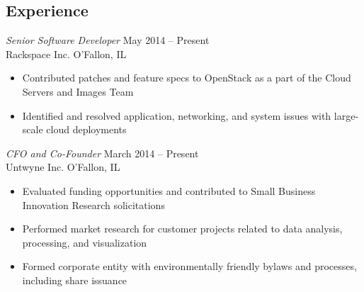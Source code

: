\documentclass[margin,line]{resume}
\begin{document}
\begin{resume}
\section{Experience}

{\sl Senior Software Developer}                                       \hfill May 2014 -- Present\\
Rackspace Inc.                                                        \hfill O'Fallon, IL
\begin{itemize} \itemsep -2pt %
\small\item Contributed patches and feature specs to OpenStack as a part of the Cloud Servers and Images Team
\small\item Identified and resolved application, networking, and system issues with large-scale cloud deployments
\end{itemize}

{\sl CFO and Co-Founder}                                              \hfill March 2014 -- Present\\
Untwyne Inc.                                                          \hfill O'Fallon, IL
\begin{itemize} \itemsep -2pt %
\small\item Evaluated funding opportunities and contributed to Small Business Innovation Research solicitations
\small\item Performed market research for customer projects related to data analysis, processing, and visualization
\small\item Formed corporate entity with environmentally friendly bylaws and processes, including share issuance
\end{itemize}


\end{resume}
\end{document}
